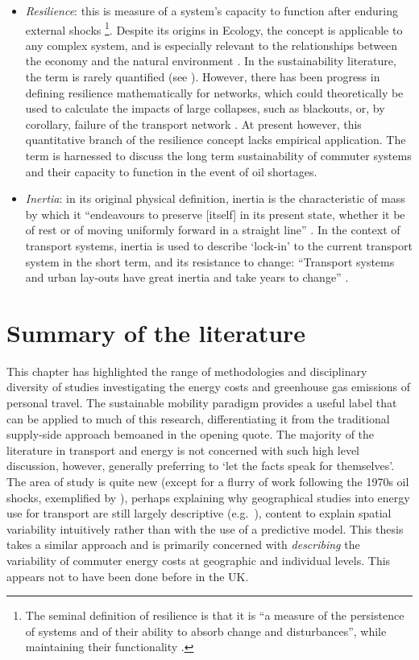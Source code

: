 \begin{itemize}
\item \emph{Resilience}: this is measure of a system's capacity to function
after enduring external shocks \citep{Holling1973}\footnote{The seminal
definition of resilience is that it is ``a measure of the persistence
of systems and of their ability to absorb change and disturbances'', while
maintaining their functionality \citep[p. 14]{Holling1973}.
}.
Despite its origins in Ecology, the concept is applicable to any complex
system, and is especially relevant to the relationships between the
economy and the natural environment \citep{Holling2001}. In the sustainability
literature, the term is rarely quantified (see \citealp{Bridge2010}). However,
there has been progress in defining resilience mathematically for 
networks, which could theoretically be used to calculate the impacts of
large collapses, such as blackouts, or, by corollary, failure of the transport
network \citep{Barthelemy2011}. At present however, this quantitative branch of
the resilience concept lacks empirical application. The term is harnessed to
discuss the long term sustainability of commuter systems and their capacity to
function in the event of oil shortages.

\item \emph{Inertia}: in its original physical definition, inertia is the
characteristic of mass by which it ``endeavours to preserve [itself] in its
present state, whether it be of rest or of moving uniformly forward in a
straight line'' \citep[p. 73]{Newton1848}. In the context of transport systems,
inertia is used to describe `lock-in' to the current
transport system in the short term, and its resistance to change:
``Transport systems and urban lay-outs have great inertia and take years to
change'' \citep[p. 365]{Chapman2007}.
\end{itemize}

\section{Summary of the literature} \label{sc2sum}
This chapter has highlighted the range of methodologies and disciplinary
diversity of studies investigating the energy costs and
greenhouse gas emissions of personal travel.
The sustainable mobility paradigm provides a useful label that can be applied to
much of this research, differentiating it from the traditional supply-side
approach bemoaned in the opening quote. The majority of the literature in
transport and energy is not concerned with such high level discussion, however,
generally preferring to `let the facts speak for themselves'. The area of
study is quite new (except for a flurry of work following the
1970s oil shocks, exemplified by \citet{Fels1975}), perhaps explaining why
geographical studies into energy use for transport are still
largely descriptive (e.g.~\citealp{Marique2013, Boussauw2009}), content to
explain spatial variability intuitively rather than with the use of a
predictive model. This thesis takes a similar approach and is primarily
concerned with \emph{describing} the variability of commuter energy costs
at geographic and individual levels. This appears not to have been done
before in the UK.

